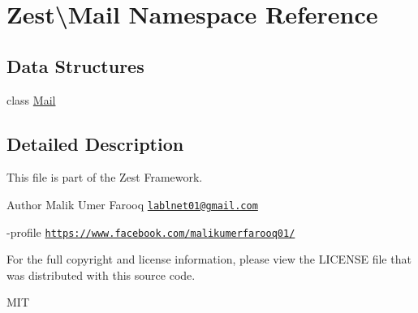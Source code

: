 \hypertarget{namespace_zest_1_1_mail}{}\section{Zest\textbackslash{}Mail Namespace Reference}
\label{namespace_zest_1_1_mail}
\subsection*{Data Structures}
\begin{DoxyCompactItemize}
\item 
class \mbox{\hyperlink{class_zest_1_1_mail_1_1_mail}{Mail}}
\end{DoxyCompactItemize}


\subsection{Detailed Description}
This file is part of the Zest Framework.

\begin{DoxyAuthor}{Author}
Malik Umer Farooq \href{mailto:lablnet01@gmail.com}{\tt lablnet01@gmail.\+com} 

-\/profile \href{https://www.facebook.com/malikumerfarooq01/}{\tt https\+://www.\+facebook.\+com/malikumerfarooq01/}
\end{DoxyAuthor}
For the full copyright and license information, please view the L\+I\+C\+E\+N\+SE file that was distributed with this source code.

M\+IT 